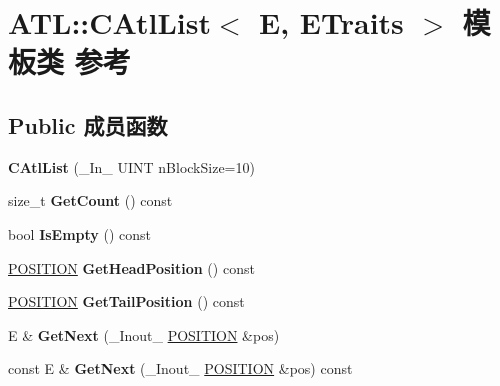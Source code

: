 \hypertarget{class_a_t_l_1_1_c_atl_list}{}\section{A\+TL\+:\+:C\+Atl\+List$<$ E, E\+Traits $>$ 模板类 参考}
\label{class_a_t_l_1_1_c_atl_list}
\subsection*{Public 成员函数}
\begin{DoxyCompactItemize}
\item 
\mbox{\label{class_a_t_l_1_1_c_atl_list_a25f9c1be61416ad8f16eef7806e6bcf3}} 
{\bfseries C\+Atl\+List} (\+\_\+\+In\+\_\+ U\+I\+NT n\+Block\+Size=10)
\item 
\mbox{\label{class_a_t_l_1_1_c_atl_list_abbc8d20d8f4c83b5a6b32c0335e48956}} 
size\+\_\+t {\bfseries Get\+Count} () const
\item 
\mbox{\label{class_a_t_l_1_1_c_atl_list_a16fd52a038c321c64267f282cb9bd28e}} 
bool {\bfseries Is\+Empty} () const
\item 
\mbox{\label{class_a_t_l_1_1_c_atl_list_a720bb7cce820bb128ef59c5548abdeb3}} 
\hyperlink{struct_____p_o_s_i_t_i_o_n}{P\+O\+S\+I\+T\+I\+ON} {\bfseries Get\+Head\+Position} () const
\item 
\mbox{\label{class_a_t_l_1_1_c_atl_list_a25116572bea05e84bd46d52611ca2e94}} 
\hyperlink{struct_____p_o_s_i_t_i_o_n}{P\+O\+S\+I\+T\+I\+ON} {\bfseries Get\+Tail\+Position} () const
\item 
\mbox{\label{class_a_t_l_1_1_c_atl_list_a80581f6a2c61758e8f66a17ca8bc3ade}} 
E \& {\bfseries Get\+Next} (\+\_\+\+Inout\+\_\+ \hyperlink{struct_____p_o_s_i_t_i_o_n}{P\+O\+S\+I\+T\+I\+ON} \&pos)
\item 
\mbox{\label{class_a_t_l_1_1_c_atl_list_a6a238cc2d6515aee4d099baa77eacba0}} 
const E \& {\bfseries Get\+Next} (\+\_\+\+Inout\+\_\+ \hyperlink{struct_____p_o_s_i_t_i_o_n}{P\+O\+S\+I\+T\+I\+ON} \&pos) const

\end{DoxyCompactItemize}
